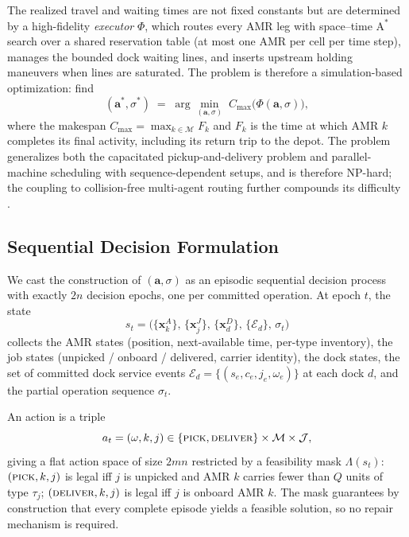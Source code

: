 The realized travel and waiting times are not fixed constants but are
determined by a high-fidelity \emph{executor} $\Phi$, which routes every
AMR leg with space--time $\mathrm{A}^{*}$ search over a shared
reservation table (at most one AMR per cell per time step), manages the
bounded dock waiting lines, and inserts upstream holding maneuvers when
lines are saturated. The problem is therefore a simulation-based
optimization: find
\begin{equation}
(\bm{a}^{*},\sigma^{*}) \;=\;
\arg\min_{(\bm{a},\sigma)} \; C_{\max}\big(\Phi(\bm{a},\sigma)\big),
\label{eq:objective}
\end{equation}
where the makespan $C_{\max}=\max_{k\in\mathcal{M}} F_k$ and $F_k$ is
the time at which AMR $k$ completes its final activity, including its
return trip to the depot. The problem generalizes both the capacitated
pickup-and-delivery problem and parallel-machine scheduling with
sequence-dependent setups, and is therefore NP-hard; the coupling to
collision-free multi-agent routing further compounds its difficulty
\cite{stern2019mapf}.

\subsection{Sequential Decision Formulation}
\label{sec:mdp}

We cast the construction of $(\bm{a},\sigma)$ as an episodic sequential
decision process with exactly $2n$ decision epochs, one per committed
operation. At epoch $t$, the state
\begin{equation}
s_t=\big(\{\bm{x}^{A}_{k}\},\, \{\bm{x}^{J}_{j}\},\, \{\bm{x}^{D}_{d}\},\,
\{\mathcal{E}_d\},\, \sigma_{t}\big)
\label{eq:state}
\end{equation}
collects the AMR states (position, next-available time, per-type
inventory), the job states (unpicked / onboard / delivered, carrier
identity), the dock states, the set of committed dock service events
$\mathcal{E}_d=\{(s_e,c_e,j_e,\omega_e)\}$ at each dock $d$, and the
partial operation sequence $\sigma_t$.

An action is a triple
\begin{equation}
a_t=(\omega,k,j)\in\{\textsc{pick},\textsc{deliver}\}\times\mathcal{M}\times\mathcal{J},
\label{eq:action}
\end{equation}
giving a flat action space of size $2mn$ restricted by a feasibility
mask $\Lambda(s_t)$: $(\textsc{pick},k,j)$ is legal iff $j$ is unpicked
and AMR $k$ carries fewer than $Q$ units of type $\tau_j$;
$(\textsc{deliver},k,j)$ is legal iff $j$ is onboard AMR $k$. The mask
guarantees by construction that every complete episode yields a feasible
solution, so no repair mechanism is required.

